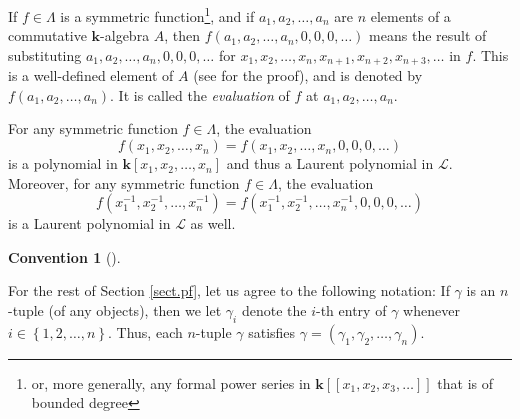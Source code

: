 \documentclass[numbers=enddot,12pt,final,onecolumn,notitlepage]{scrartcl}%
\theoremstyle{definition}
\newtheorem{conv}[theo]{Convention}
\newenvironment{convention}[1][]
{\begin{conv}[#1]\begin{leftbar}}
{\end{leftbar}\end{conv}}
\begin{document}
If $f\in\Lambda$ is a symmetric function\footnote{or, more generally, any
formal power series in $\mathbf{k}\left[  \left[  x_{1},x_{2},x_{3}%
,\ldots\right]  \right]  $ that is of bounded degree}, and if $a_{1}%
,a_{2},\ldots,a_{n}$ are $n$ elements of a commutative $\mathbf{k}$-algebra
$A$, then $f\left(  a_{1},a_{2},\ldots,a_{n},0,0,0,\ldots\right)  $ means the
result of substituting $a_{1},a_{2},\ldots,a_{n},0,0,0,\ldots$ for
$x_{1},x_{2},\ldots,x_{n},x_{n+1},x_{n+2},x_{n+3},\ldots$ in $f$. This is a
well-defined element of $A$ (see \cite[Exercise 2.1.2]{GriRei} for the proof),
and is denoted by $f\left(  a_{1},a_{2},\ldots,a_{n}\right)  $. It is called
the \emph{evaluation} of $f$ at $a_{1},a_{2},\ldots,a_{n}$.

For any symmetric function $f\in\Lambda$, the evaluation%
\[
f\left(  x_{1},x_{2},\ldots,x_{n}\right)  =f\left(  x_{1},x_{2},\ldots
,x_{n},0,0,0,\ldots\right)
\]
is a polynomial in $\mathbf{k}\left[  x_{1},x_{2},\ldots,x_{n}\right]  $ and
thus a Laurent polynomial in $\mathcal{L}$. Moreover, for any symmetric
function $f\in\Lambda$, the evaluation
\[
f\left(  x_{1}^{-1},x_{2}^{-1},\ldots,x_{n}^{-1}\right)  =f\left(  x_{1}%
^{-1},x_{2}^{-1},\ldots,x_{n}^{-1},0,0,0,\ldots\right)
\]
is a Laurent polynomial in $\mathcal{L}$ as well.

\begin{convention}
\label{conv.gammai}For the rest of Section \ref{sect.pf}, let us agree to the
following notation: If $\gamma$ is an $n$-tuple (of any objects), then we let
$\gamma_{i}$ denote the $i$-th entry of $\gamma$ whenever $i\in\left\{
1,2,\ldots,n\right\}  $. Thus, each $n$-tuple $\gamma$ satisfies
$\gamma=\left(  \gamma_{1},\gamma_{2},\ldots,\gamma_{n}\right)  $.
\end{convention}
\end{document}
